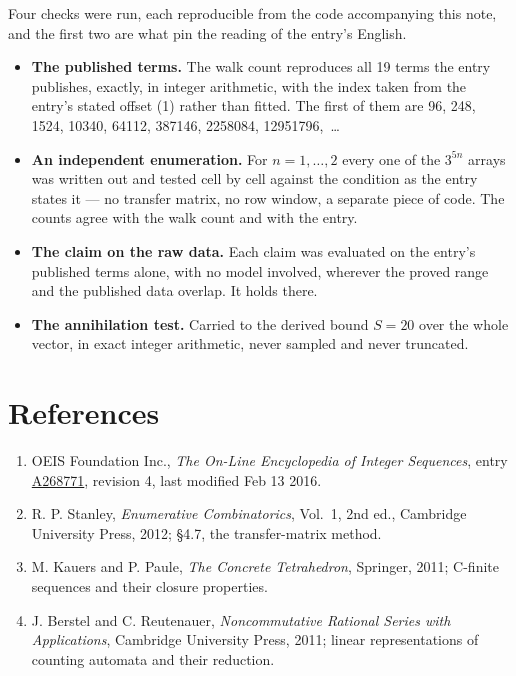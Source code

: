\documentclass[11pt]{article}
\theoremstyle{definition}
\begin{document}
Four checks were run, each reproducible from the code accompanying this note, and the first two are what pin the reading of the entry's English.

\begin{itemize}

\item {\bfseries The published terms.} The walk count reproduces all 19 terms the entry publishes, exactly, in integer arithmetic, with the index taken from the entry's stated offset (1) rather than fitted. The first of them are 96, 248, 1524, 10340, 64112, 387146, 2258084, 12951796,~\dots

\item {\bfseries An independent enumeration.} For $n = 1,\dots,2$ every one of the $3^{5n}$ arrays was written out and tested cell by cell against the condition as the entry states it --- no transfer matrix, no row window, a separate piece of code. The counts agree with the walk count and with the entry.

\item {\bfseries The claim on the raw data.} Each claim was evaluated on the entry's published terms alone, with no model involved, wherever the proved range and the published data overlap. It holds there.

\item {\bfseries The annihilation test.} Carried to the derived bound $S = 20$ over the whole vector, in exact integer arithmetic, never sampled and never truncated.

\end{itemize}

\section{References}

\begin{enumerate}

\item OEIS Foundation Inc., \emph{The On-Line Encyclopedia of Integer Sequences}, entry \href{https://oeis.org/A268771}{A268771}, revision 4, last modified Feb 13 2016.

\item R. P. Stanley, \emph{Enumerative Combinatorics}, Vol.~1, 2nd ed., Cambridge University Press, 2012; \S4.7, the transfer-matrix method.

\item M. Kauers and P. Paule, \emph{The Concrete Tetrahedron}, Springer, 2011; C-finite sequences and their closure properties.

\item J. Berstel and C. Reutenauer, \emph{Noncommutative Rational Series with Applications}, Cambridge University Press, 2011; linear representations of counting automata and their reduction.

\end{enumerate}
\end{document}
